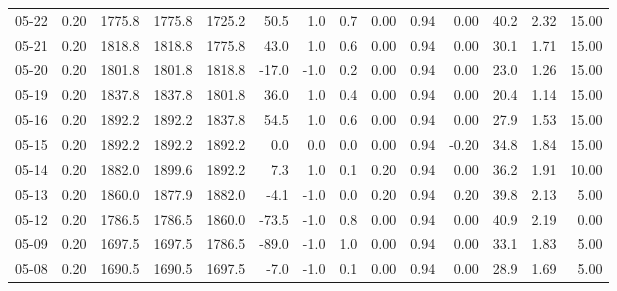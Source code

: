 \begin{threeparttable}
{\begin{tabular}{lrrrrrrrrrrrrr}
  05-22 &     0.20 & 1775.8 & 1775.8 & 1725.2 &       50.5 &                      1.0 &                 0.7 &       0.00 &      0.94 &           0.00 &             40.2 &            2.32 &                  15.00 \\
  05-21 &     0.20 & 1818.8 & 1818.8 & 1775.8 &       43.0 &                      1.0 &                 0.6 &       0.00 &      0.94 &           0.00 &             30.1 &            1.71 &                  15.00 \\
  05-20 &     0.20 & 1801.8 & 1801.8 & 1818.8 &      -17.0 &                     -1.0 &                 0.2 &       0.00 &      0.94 &           0.00 &             23.0 &            1.26 &                  15.00 \\
  05-19 &     0.20 & 1837.8 & 1837.8 & 1801.8 &       36.0 &                      1.0 &                 0.4 &       0.00 &      0.94 &           0.00 &             20.4 &            1.14 &                  15.00 \\
  05-16 &     0.20 & 1892.2 & 1892.2 & 1837.8 &       54.5 &                      1.0 &                 0.6 &       0.00 &      0.94 &           0.00 &             27.9 &            1.53 &                  15.00 \\
  05-15 &     0.20 & 1892.2 & 1892.2 & 1892.2 &        0.0 &                      0.0 &                 0.0 &       0.00 &      0.94 &          -0.20 &             34.8 &            1.84 &                  15.00 \\
  05-14 &     0.20 & 1882.0 & 1899.6 & 1892.2 &        7.3 &                      1.0 &                 0.1 &       0.20 &      0.94 &           0.00 &             36.2 &            1.91 &                  10.00 \\
  05-13 &     0.20 & 1860.0 & 1877.9 & 1882.0 &       -4.1 &                     -1.0 &                 0.0 &       0.20 &      0.94 &           0.20 &             39.8 &            2.13 &                   5.00 \\
  05-12 &     0.20 & 1786.5 & 1786.5 & 1860.0 &      -73.5 &                     -1.0 &                 0.8 &       0.00 &      0.94 &           0.00 &             40.9 &            2.19 &                   0.00 \\
  05-09 &     0.20 & 1697.5 & 1697.5 & 1786.5 &      -89.0 &                     -1.0 &                 1.0 &       0.00 &      0.94 &           0.00 &             33.1 &            1.83 &                   5.00 \\
  05-08 &     0.20 & 1690.5 & 1690.5 & 1697.5 &       -7.0 &                     -1.0 &                 0.1 &       0.00 &      0.94 &           0.00 &             28.9 &            1.69 &                   5.00 \\

\end{tabular}}
\end{threeparttable}
